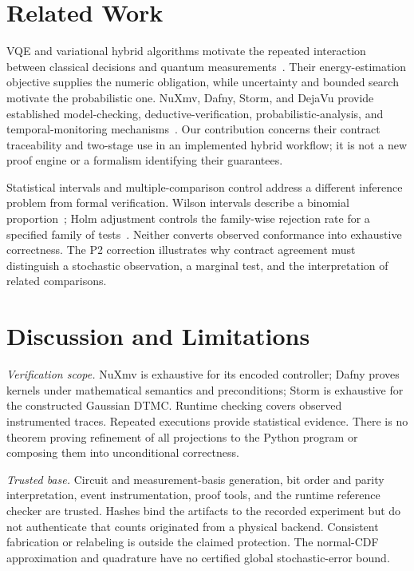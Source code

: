\documentclass[conference]{IEEEtran}
\begin{document}
\section{Related Work}
VQE and variational hybrid algorithms motivate the repeated interaction between classical decisions and quantum measurements~\cite{peruzzo2014,mcclean2016}. Their energy-estimation objective supplies the numeric obligation, while uncertainty and bounded search motivate the probabilistic one. NuXmv, Dafny, Storm, and DejaVu provide established model-checking, deductive-verification, probabilistic-analysis, and temporal-monitoring mechanisms~\cite{nuxmv,dafny,storm,dejavu}. Our contribution concerns their contract traceability and two-stage use in an implemented hybrid workflow; it is not a new proof engine or a formalism identifying their guarantees.

Statistical intervals and multiple-comparison control address a different inference problem from formal verification. Wilson intervals describe a binomial proportion~\cite{wilson}; Holm adjustment controls the family-wise rejection rate for a specified family of tests~\cite{holm}. Neither converts observed conformance into exhaustive correctness. The P2 correction illustrates why contract agreement must distinguish a stochastic observation, a marginal test, and the interpretation of related comparisons.

\section{Discussion and Limitations}
\label{sec:limitations}
\emph{Verification scope.} NuXmv is exhaustive for its encoded controller; Dafny proves kernels under mathematical semantics and preconditions; Storm is exhaustive for the constructed Gaussian DTMC. Runtime checking covers observed instrumented traces. Repeated executions provide statistical evidence. There is no theorem proving refinement of all projections to the Python program or composing them into unconditional correctness.

\emph{Trusted base.} Circuit and measurement-basis generation, bit order and parity interpretation, event instrumentation, proof tools, and the runtime reference checker are trusted. Hashes bind the artifacts to the recorded experiment but do not authenticate that counts originated from a physical backend. Consistent fabrication or relabeling is outside the claimed protection. The normal-CDF approximation and quadrature have no certified global stochastic-error bound.
\end{document}
